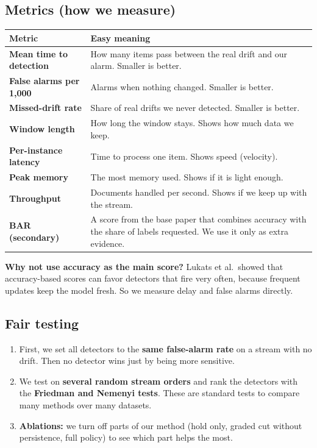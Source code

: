 \documentclass[11pt,a4paper]{article}
\begin{document}
\subsection{Metrics (how we measure)}
\begin{center}
\small
\begin{tabular}{@{}>{\bfseries}p{4.3cm}p{9cm}@{}}
\toprule
Metric & Easy meaning \\
\midrule
Mean time to detection & How many items pass between the real drift and our alarm. Smaller is better. \\
False alarms per 1,000 & Alarms when nothing changed. Smaller is better. \\
Missed-drift rate & Share of real drifts we never detected. Smaller is better. \\
Window length & How long the window stays. Shows how much data we keep. \\
Per-instance latency & Time to process one item. Shows speed (velocity). \\
Peak memory & The most memory used. Shows if it is light enough. \\
Throughput & Documents handled per second. Shows if we keep up with the stream. \\
BAR (secondary) & A score from the base paper that combines accuracy with the share of labels requested. We use it only as extra evidence. \\
\bottomrule
\end{tabular}
\end{center}

\textbf{Why not use accuracy as the main score?} Lukats et al.\ showed that accuracy-based scores can favor detectors that fire very often, because frequent updates keep the model fresh. So we measure delay and false alarms directly.

\subsection{Fair testing}
\begin{enumerate}
  \item First, we set all detectors to the \textbf{same false-alarm rate} on a stream with no drift. Then no detector wins just by being more sensitive.
  \item We test on \textbf{several random stream orders} and rank the detectors with the \textbf{Friedman and Nemenyi tests}. These are standard tests to compare many methods over many datasets.
  \item \textbf{Ablations:} we turn off parts of our method (hold only, graded cut without persistence, full policy) to see which part helps the most.
\end{enumerate}
\end{document}
